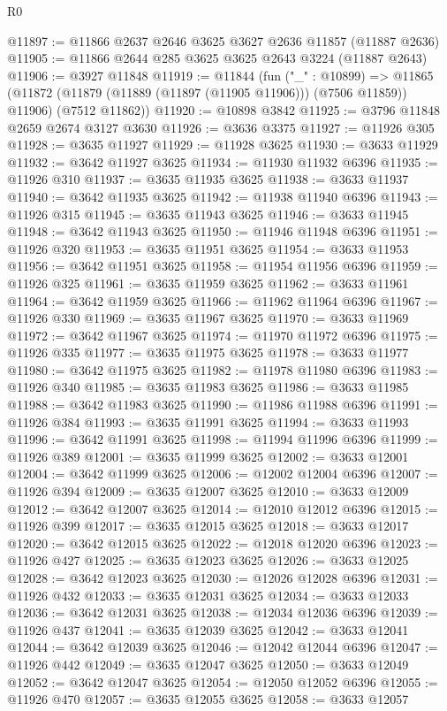 \begin{lexlean}{R0}
\begin{coremodule}
@11897 := @11866 @2637 @2646 @3625 @3627 @2636 @11857 (@11887 @2636)
@11905 := @11866 @2644 @285 @3625 @3625 @2643 @3224 (@11887 @2643)
@11906 := @3927 @11848
@11919 := @11844
    (fun ("_" : @10899) =>
    @11865 (@11872 (@11879 (@11889 (@11897 (@11905 @11906))) (@7506 @11859)) @11906) (@7512 @11862))
@11920 := @10898 @3842
@11925 := @3796 @11848 @2659 @2674 @3127 @3630
@11926 := @3636 @3375
@11927 := @11926 @305
@11928 := @3635 @11927
@11929 := @11928 @3625
@11930 := @3633 @11929
@11932 := @3642 @11927 @3625
@11934 := @11930 @11932 @6396
@11935 := @11926 @310
@11937 := @3635 @11935 @3625
@11938 := @3633 @11937
@11940 := @3642 @11935 @3625
@11942 := @11938 @11940 @6396
@11943 := @11926 @315
@11945 := @3635 @11943 @3625
@11946 := @3633 @11945
@11948 := @3642 @11943 @3625
@11950 := @11946 @11948 @6396
@11951 := @11926 @320
@11953 := @3635 @11951 @3625
@11954 := @3633 @11953
@11956 := @3642 @11951 @3625
@11958 := @11954 @11956 @6396
@11959 := @11926 @325
@11961 := @3635 @11959 @3625
@11962 := @3633 @11961
@11964 := @3642 @11959 @3625
@11966 := @11962 @11964 @6396
@11967 := @11926 @330
@11969 := @3635 @11967 @3625
@11970 := @3633 @11969
@11972 := @3642 @11967 @3625
@11974 := @11970 @11972 @6396
@11975 := @11926 @335
@11977 := @3635 @11975 @3625
@11978 := @3633 @11977
@11980 := @3642 @11975 @3625
@11982 := @11978 @11980 @6396
@11983 := @11926 @340
@11985 := @3635 @11983 @3625
@11986 := @3633 @11985
@11988 := @3642 @11983 @3625
@11990 := @11986 @11988 @6396
@11991 := @11926 @384
@11993 := @3635 @11991 @3625
@11994 := @3633 @11993
@11996 := @3642 @11991 @3625
@11998 := @11994 @11996 @6396
@11999 := @11926 @389
@12001 := @3635 @11999 @3625
@12002 := @3633 @12001
@12004 := @3642 @11999 @3625
@12006 := @12002 @12004 @6396
@12007 := @11926 @394
@12009 := @3635 @12007 @3625
@12010 := @3633 @12009
@12012 := @3642 @12007 @3625
@12014 := @12010 @12012 @6396
@12015 := @11926 @399
@12017 := @3635 @12015 @3625
@12018 := @3633 @12017
@12020 := @3642 @12015 @3625
@12022 := @12018 @12020 @6396
@12023 := @11926 @427
@12025 := @3635 @12023 @3625
@12026 := @3633 @12025
@12028 := @3642 @12023 @3625
@12030 := @12026 @12028 @6396
@12031 := @11926 @432
@12033 := @3635 @12031 @3625
@12034 := @3633 @12033
@12036 := @3642 @12031 @3625
@12038 := @12034 @12036 @6396
@12039 := @11926 @437
@12041 := @3635 @12039 @3625
@12042 := @3633 @12041
@12044 := @3642 @12039 @3625
@12046 := @12042 @12044 @6396
@12047 := @11926 @442
@12049 := @3635 @12047 @3625
@12050 := @3633 @12049
@12052 := @3642 @12047 @3625
@12054 := @12050 @12052 @6396
@12055 := @11926 @470
@12057 := @3635 @12055 @3625
@12058 := @3633 @12057

\end{coremodule}
\end{lexlean}
